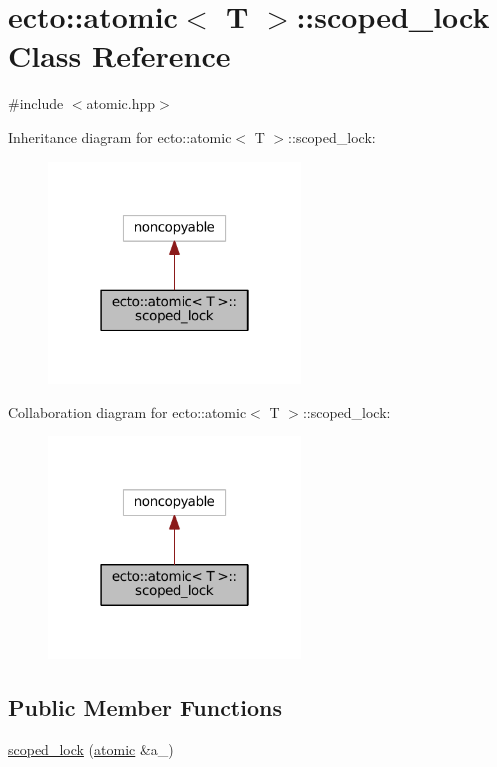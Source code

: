 \hypertarget{classecto_1_1atomic_1_1scoped__lock}{}\section{ecto\+:\+:atomic$<$ T $>$\+:\+:scoped\+\_\+lock Class Reference}
\label{classecto_1_1atomic_1_1scoped__lock}


{\ttfamily \#include $<$atomic.\+hpp$>$}



Inheritance diagram for ecto\+:\+:atomic$<$ T $>$\+:\+:scoped\+\_\+lock\+:\nopagebreak
\begin{figure}[H]
\begin{center}
\leavevmode
\includegraphics[width=190pt]{classecto_1_1atomic_1_1scoped__lock__inherit__graph}
\end{center}
\end{figure}


Collaboration diagram for ecto\+:\+:atomic$<$ T $>$\+:\+:scoped\+\_\+lock\+:\nopagebreak
\begin{figure}[H]
\begin{center}
\leavevmode
\includegraphics[width=190pt]{classecto_1_1atomic_1_1scoped__lock__coll__graph}
\end{center}
\end{figure}
\subsection*{Public Member Functions}
\begin{DoxyCompactItemize}
\item 
\hyperlink{classecto_1_1atomic_1_1scoped__lock_aa5a512f623ed5bd0f4010e200ad86e14}{scoped\+\_\+lock} (\hyperlink{classecto_1_1atomic}{atomic} \&a\+\_\+)
\end{DoxyCompactItemize}
